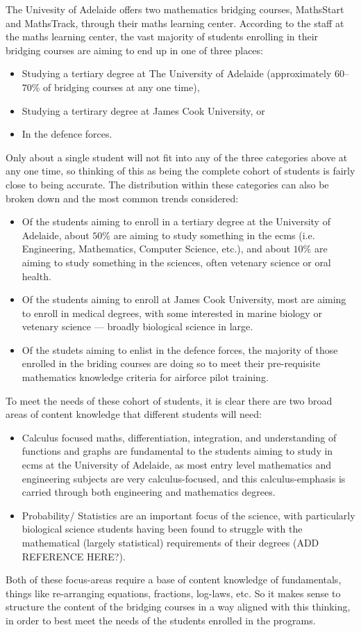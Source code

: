 \documentclass[twoside,12pt,a4paper]{report}
\begin{document}
The Univesity of Adelaide offers two mathematics bridging courses, MathsStart and MathsTrack, through their maths learning center. According to the staff at the maths learning center, the vast majority of students enrolling in their bridging courses are aiming to end up in one of three places:
\begin{itemize}
	\item Studying a tertiary degree at The University of Adelaide (approximately $60$--$70$\% of bridging courses at any one time),
	\item Studying a tertirary degree at James Cook University, or
	\item In the defence forces.
\end{itemize}
Only about a single student will not fit into any of the three categories above at any one time, so thinking of this as being the complete cohort of students is fairly close to being accurate. The distribution within these categories can also be broken down and the most common trends considered:
\begin{itemize}
	\item Of the students aiming to enroll in a tertiary degree at the University of Adelaide, about $50$\% are aiming to study something in the \gls{ecms} (i.e. Engineering, Mathematics, Computer Science, etc.), and about $10$\% are aiming to study something in the sciences, often vetenary science or oral health.
	\item Of the students aiming to enroll at James Cook University, most are aiming to enroll in medical degrees, with some interested in marine biology or vetenary science --- broadly biological science in large.
	\item Of the studets aiming to enlist in the defence forces, the majority of those enrolled in the briding courses are doing so to meet their pre-requisite mathematics knowledge criteria for airforce pilot training.
\end{itemize}

To meet the needs of these cohort of students, it is clear there are two broad areas of content knowledge that different students will need:
\begin{itemize}
	\item Calculus focused maths, differentiation, integration, and understanding of functions and graphs are fundamental to the students aiming to study in \gls{ecms} at the University of Adelaide, as most entry level mathematics and engineering subjects are very calculus-focused, and this calculus-emphasis is carried through both engineering and mathematics degrees. 
	\item Probability/ Statistics are an important focus of the science, with particularly biological science students having been found to struggle with the mathematical (largely statistical) requirements of their degrees (ADD REFERENCE HERE?). 
\end{itemize}
Both of these focus-areas require a base of content knowledge of fundamentals, things like re-arranging equations, fractions, log-laws, etc. So it makes sense to structure the content of the bridging courses in a way aligned with this thinking, in order to best meet the needs of the students enrolled in the programs.
\end{document}
